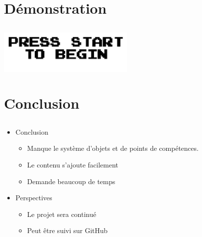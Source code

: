 \documentclass{beamer}
\begin{document}
\section{Démonstration}
\subsection{}
\begin{frame}
\begin{center}
\includegraphics[width=0.5\textwidth]{img/pres_demo.png}
\end{center}
\end{frame}

\section{Conclusion}
\subsection{}
\begin{frame}
\begin{itemize}
\item Conclusion
\begin{itemize}
	\item Manque le système d'objets et de points de compétences.
	\item Le contenu s'ajoute facilement
	\item Demande beaucoup de temps
\end{itemize}
\item Perspectives
\begin{itemize}
	\item Le projet sera continué
	\item Peut être suivi sur GitHub
\end{itemize}
\end{itemize}
\end{frame}
\end{document}
